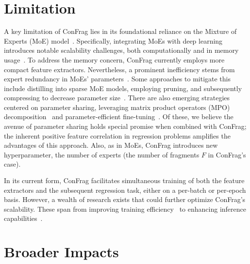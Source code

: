 \documentclass{article}
\theoremstyle{plain}
\theoremstyle{definition}
\theoremstyle{remark}
\begin{document}
\section{Limitation}\label{sec:limitations}
A key limitation of ConFrag lies in its foundational reliance on the Mixture of Experts (MoE) model~\citep{jacobs1991MoE}. 
Specifically, integrating MoEs with deep learning introduces notable scalability challenges, both computationally and in memory usage~\citep{zuo21, zoph22, zhang21b}. 
To address the memory concern, ConFrag currently employs more compact feature extractors. Nevertheless, a prominent inefficiency stems from expert redundancy in MoEs' parameters~\citep{zuo21}. 
Some approaches to mitigate this include distilling into sparse MoE models, employing pruning, and subsequently compressing to decrease parameter size~\citep{yjkim21,fedus21}. 
There are also emerging strategies centered on parameter sharing, leveraging matrix product operators (MPO) decomposition~\citep{gao20mpo, gao22mpo} and parameter-efficient fine-tuning~\citep{zadouri23}. 
Of these, we believe the avenue of parameter sharing holds special promise when combined with ConFrag; the inherent positive feature correlation in regression problems amplifies the advantages of this approach.
Also, as in MoEs, ConFrag introduces new hyperparameter, the number of experts (the number of fragments $F$ in ConFrag's case).

In its current form, ConFrag facilitates simultaneous training of both the feature extractors and the subsequent regression task, either on a per-batch or per-epoch basis. 
However, a wealth of research exists that could further optimize ConFrag's scalability. These span from improving training efficiency~\citep{he21fastmoe,zoph22,lepikhin21,lewis21} to enhancing inference capabilities~\citep{zhang21b, fedus21}.

\section{Broader Impacts}\label{sec:broader_impacts}
\end{document}
